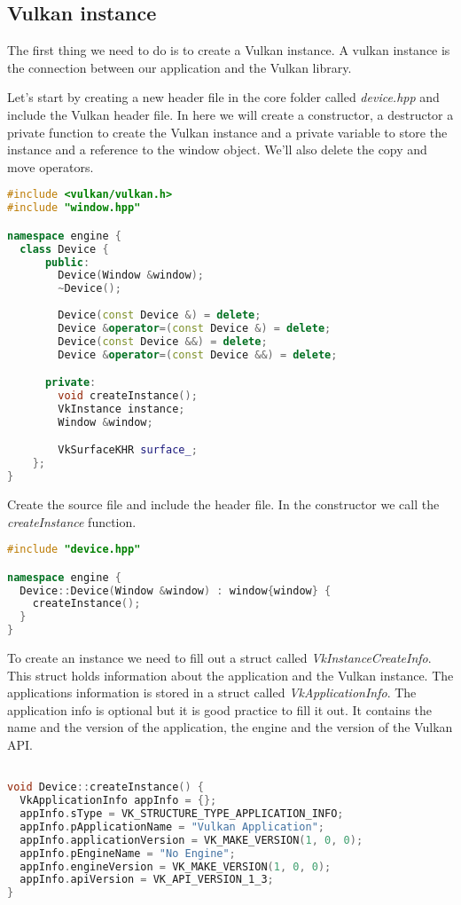\documentclass[12pt]{report} \usepackage{preamble}
\begin{document}
\subsection{Vulkan instance}

The first thing we need to do is to create a Vulkan instance.
A vulkan instance is the connection between our application and the Vulkan library.

Let's start by creating a new header file in the core folder called \textit{device.hpp}
and include the Vulkan header file. In here we will create a constructor, a destructor
a private function to create the Vulkan instance and a private variable to store the instance
and a reference to the window object. We'll also delete the copy and move operators.

\begin{lstlisting}[language=C++]
#include <vulkan/vulkan.h>
#include "window.hpp"

namespace engine {
  class Device {
      public:
        Device(Window &window);
        ~Device();
        
        Device(const Device &) = delete;
        Device &operator=(const Device &) = delete;
        Device(const Device &&) = delete;
        Device &operator=(const Device &&) = delete;

      private:
        void createInstance();
        VkInstance instance;
        Window &window;

        VkSurfaceKHR surface_;
    };
}
\end{lstlisting}

Create the source file and include the header file. In the constructor we call the
\textit{createInstance} function.

\begin{lstlisting}[language=C++]
#include "device.hpp"

namespace engine {
  Device::Device(Window &window) : window{window} {
    createInstance();
  }
}
\end{lstlisting}

To create an instance we need to fill out a struct called \textit{VkInstanceCreateInfo}.
This struct holds information about the application and the Vulkan instance.
The applications information is stored in a struct called \textit{VkApplicationInfo}.
The application info is optional but it is good practice to fill it out. It contains
the name and the version of the application, the engine and the version of the Vulkan API.

\begin{lstlisting}[language=C++]

void Device::createInstance() {
  VkApplicationInfo appInfo = {};
  appInfo.sType = VK_STRUCTURE_TYPE_APPLICATION_INFO;
  appInfo.pApplicationName = "Vulkan Application";
  appInfo.applicationVersion = VK_MAKE_VERSION(1, 0, 0);
  appInfo.pEngineName = "No Engine";
  appInfo.engineVersion = VK_MAKE_VERSION(1, 0, 0);
  appInfo.apiVersion = VK_API_VERSION_1_3;
}
\end{lstlisting}
\end{document}
